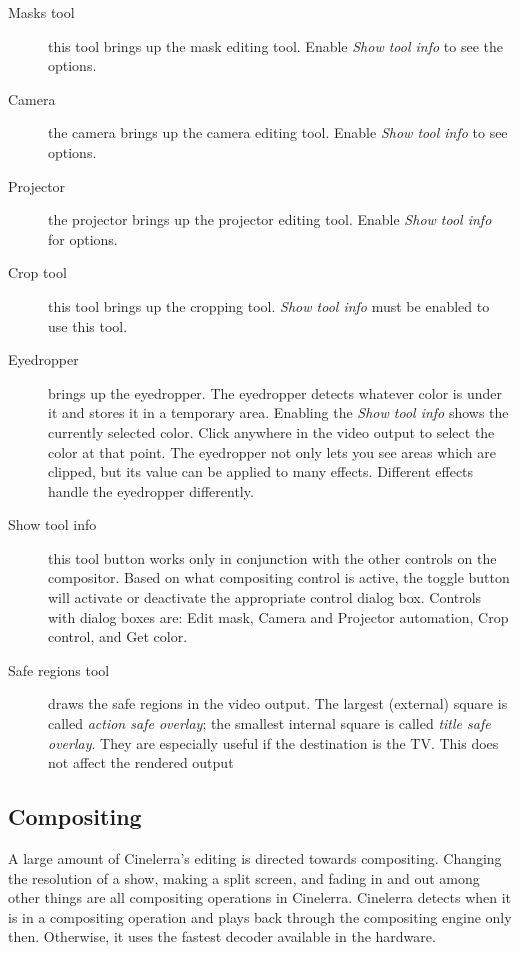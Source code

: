 \begin{description}
    \item[Masks tool] this tool brings up the mask editing tool. Enable \textit{Show tool info} to see the options.
    \item[Camera]  the camera brings up the camera editing tool. Enable \textit{Show tool info} to see options.
    \item[Projector]  the projector brings up the projector editing tool. Enable \textit{Show tool info} for options.
    \item[Crop tool]  this tool brings up the cropping tool. \textit{Show tool info} must be enabled to use this tool.
    \item[Eyedropper]  brings up the eyedropper. The eyedropper detects whatever color is under it and stores it
        in a temporary area. Enabling the \textit{Show tool info} shows the currently selected color. Click
        anywhere in the video output to select the color at that point. The eyedropper not only lets you see
        areas which are clipped, but its value can be applied to many effects. Different effects handle the
        eyedropper differently.
    \item[Show tool info]  this tool button works only in conjunction with the other controls on the compositor.
        Based on what compositing control is active, the toggle button will activate or deactivate the
        appropriate control dialog box. Controls with dialog boxes are: Edit mask, Camera and Projector
        automation, Crop control, and Get color.
    \item[Safe regions tool]  draws the safe regions in the video output. The largest (external) square is called \textit{action safe overlay}; the smallest internal square is called \textit{title safe overlay}. They are especially useful if the destination is the TV. This does not affect the rendered output
\end{description}

\subsection{Compositing}%
\label{sub:compositing}

A large amount of Cinelerra's editing is directed towards compositing. 
Changing the resolution of a show, making a split screen, and fading in and out among other things are all compositing operations in Cinelerra. 
Cinelerra detects when it is in a compositing operation and plays back through the compositing engine only then. 
Otherwise, it uses the fastest decoder available in the hardware.

